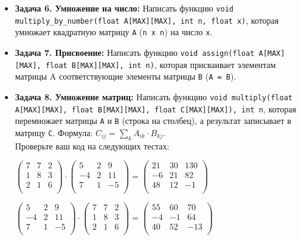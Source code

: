 \documentclass{article}
\begin{document}
\begin{itemize}
\item \textbf{Задача 6. Умножение на число:} Написать функцию \texttt{void multiply\_by\_number(float A[MAX][MAX], int n, float x)}, которая умножает квадратную матрицу \texttt{A} (\texttt{n x n}) на число \texttt{x}.
\item \textbf{Задача 7. Присвоение:} Написать функцию \texttt{void assign(float A[MAX][MAX], float B[MAX][MAX], int n)}, которая присваивает элементам матрицы A соответствующие элементы матрицы \texttt{B} (\texttt{A = B}).
\item \textbf{Задача 8. Умножение матриц:} Написать функцию \texttt{void multiply(float A[MAX][MAX], float B[MAX][MAX], float C[MAX][MAX]), int n}, которая перемножает матрицы \texttt{A} и \texttt{B} (строка на столбец), а результат записывает в матрицу \texttt{C}. Формула: $C_{ij} = \sum\limits_k A_{ik} \cdot B_{kj}$. \\
Проверьте ваш код на следующих тестах:

\begin{center}
$\begin{pmatrix}
7 & 7 & 2 \\
1 & 8 & 3 \\
2 & 1 & 6 \\
\end{pmatrix} \cdot 
\begin{pmatrix}
5 & 2 & 9 \\
-4 & 2 & 11 \\
7 & 1 & -5 \\
\end{pmatrix}=
\begin{pmatrix}
21 & 30 & 130 \\
-6 & 21 & 82 \\
48 & 12 & -1 \\
\end{pmatrix}
$
\end{center}

\begin{center}

$
\begin{pmatrix}
5 & 2 & 9 \\
-4 & 2 & 11 \\
7 & 1 & -5 \\
\end{pmatrix}  \cdot 
\begin{pmatrix}
7 & 7 & 2 \\
1 & 8 & 3 \\
2 & 1 & 6 \\
\end{pmatrix}
=
\begin{pmatrix}
55 & 60 & 70 \\
-4 & -1 & 64 \\
40 & 52 & -13 \\
\end{pmatrix}
$
\end{center}


\end{itemize}
\end{document}
